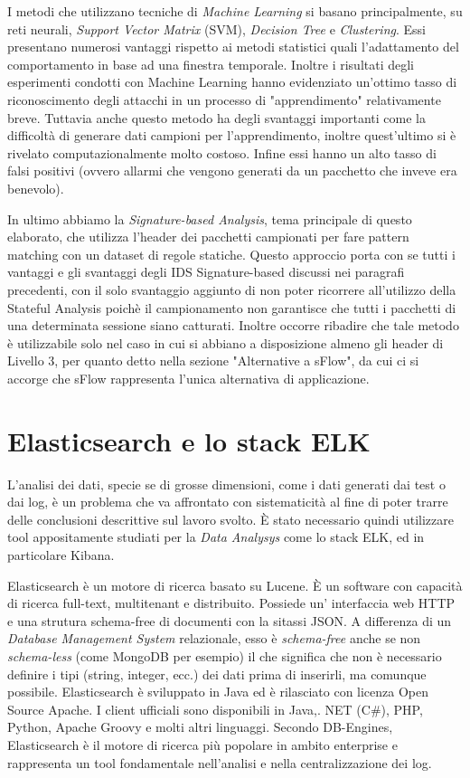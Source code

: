 \documentclass[12pt,a4paper,openright,twoside]{report}
\begin{document}
I metodi che utilizzano tecniche di {\it Machine Learning} si basano principalmente,
su reti neurali, {\it Support Vector Matrix } (SVM), {\it Decision Tree} e {\it Clustering}.
Essi presentano numerosi vantaggi rispetto ai metodi statistici quali l'adattamento
del comportamento in base ad una finestra temporale. Inoltre i risultati degli esperimenti
condotti con Machine Learning hanno evidenziato un'ottimo tasso di riconoscimento degli
attacchi in un processo di "apprendimento" relativamente breve. Tuttavia anche questo metodo
ha degli svantaggi importanti come la difficolt\`a di generare dati campioni per
l'apprendimento, inoltre quest'ultimo si \`e rivelato computazionalmente molto costoso.
Infine essi hanno un alto tasso di falsi positivi (ovvero allarmi che vengono generati da un pacchetto che inveve era
benevolo).

In ultimo abbiamo la {\it Signature-based Analysis}, tema principale di questo elaborato,
che utilizza l'header dei pacchetti campionati per fare pattern matching con un dataset
di regole statiche. Questo approccio porta con se tutti i vantaggi e gli svantaggi
degli IDS Signature-based discussi nei paragrafi precedenti, con il solo svantaggio aggiunto di
non poter ricorrere all'utilizzo della Stateful Analysis poich\`e il campionamento
non garantisce che tutti i pacchetti di una determinata sessione siano catturati.
Inoltre occorre ribadire che tale metodo \`e utilizzabile solo nel caso in cui si abbiano a disposizione
almeno gli header di Livello 3, per quanto detto nella sezione "Alternative a sFlow",
da cui ci si accorge che sFlow rappresenta l'unica alternativa di applicazione.


\newpage

\section{Elasticsearch e lo stack ELK}

L'analisi dei dati, specie se di grosse dimensioni, come i dati generati dai test o
dai log, \`e un problema che va affrontato con sistematicit\`a al fine di poter
trarre delle conclusioni descrittive sul lavoro svolto. \`E stato necessario quindi
utilizzare tool appositamente studiati per la {\it Data Analysys} come lo stack ELK, ed
in particolare Kibana.

Elasticsearch \cite{E1} \`e un motore di ricerca basato su Lucene.
\`E un software con capacit\`a di ricerca full-text, multitenant e distribuito.
Possiede un' interfaccia web HTTP e una strutura schema-free di documenti con la sitassi JSON.
A differenza di un {\it Database Management System} relazionale, esso \`e {\it schema-free}
anche se non {\it schema-less} (come MongoDB per esempio) il che significa che non \`e
necessario definire i tipi (string, integer, ecc.) dei dati prima di inserirli,
ma comunque possibile. \cite{E4}
Elasticsearch \`e sviluppato in Java ed \`e rilasciato con licenza Open Source Apache.
I client ufficiali sono disponibili in Java,. NET (C#), PHP, Python, Apache Groovy e molti altri
linguaggi.
Secondo DB-Engines, \cite{E2} Elasticsearch \`e il motore di ricerca pi\`u popolare in ambito enterprise e
rappresenta un tool fondamentale nell'analisi e nella centralizzazione dei log.
\end{document}
